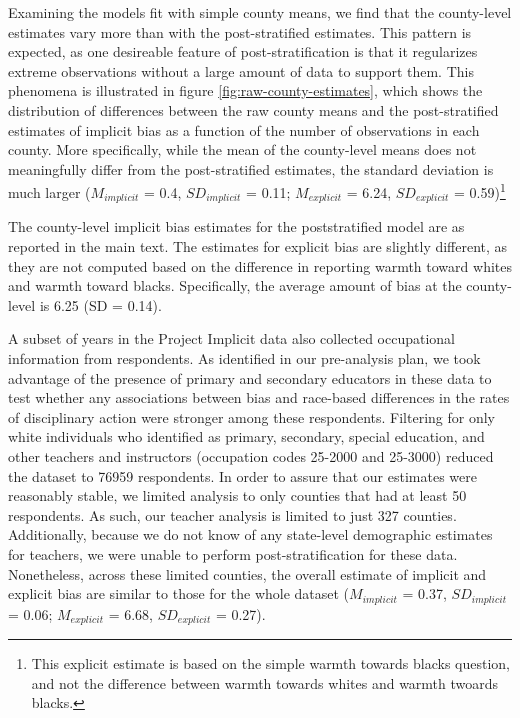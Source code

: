 \documentclass[]{article}
\let\rmarkdownfootnote\footnote%
\def\footnote{\protect\rmarkdownfootnote}
\theoremstyle{definition}
\theoremstyle{definition}
\theoremstyle{remark}
\begin{document}
Examining the models fit with simple county means, we find that the
county-level estimates vary more than with the post-stratified
estimates. This pattern is expected, as one desireable feature of
post-stratification is that it regularizes extreme observations without
a large amount of data to support them. This phenomena is illustrated in
figure \ref{fig:raw-county-estimates}, which shows the distribution of
differences between the raw county means and the post-stratified
estimates of implicit bias as a function of the number of observations
in each county. More specifically, while the mean of the county-level
means does not meaningfully differ from the post-stratified estimates,
the standard deviation is much larger (\(M_{implicit}\) = 0.4,
\(SD_{implicit}\) = 0.11; \(M_{explicit}\) = 6.24, \(SD_{explicit}\) =
0.59)\footnote{This explicit estimate is based on the simple warmth
  towards blacks question, and not the difference between warmth towards
  whites and warmth twoards blacks.}

The county-level implicit bias estimates for the poststratified model
are as reported in the main text. The estimates for explicit bias are
slightly different, as they are not computed based on the difference in
reporting warmth toward whites and warmth toward blacks. Specifically,
the average amount of bias at the county-level is 6.25 (SD = 0.14).

A subset of years in the Project Implicit data also collected
occupational information from respondents. As identified in our
pre-analysis plan, we took advantage of the presence of primary and
secondary educators in these data to test whether any associations
between bias and race-based differences in the rates of disciplinary
action were stronger among these respondents. Filtering for only white
individuals who identified as primary, secondary, special education, and
other teachers and instructors (occupation codes 25-2000 and 25-3000)
reduced the dataset to 76959 respondents. In order to assure that our
estimates were reasonably stable, we limited analysis to only counties
that had at least 50 respondents. As such, our teacher analysis is
limited to just 327 counties. Additionally, because we do not know of
any state-level demographic estimates for teachers, we were unable to
perform post-stratification for these data. Nonetheless, across these
limited counties, the overall estimate of implicit and explicit bias are
similar to those for the whole dataset (\(M_{implicit}\) = 0.37,
\(SD_{implicit}\) = 0.06; \(M_{explicit}\) = 6.68, \(SD_{explicit}\) =
0.27).
\end{document}
